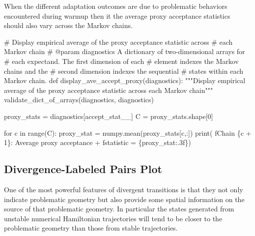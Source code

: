 \documentclass[
  letterpaper,
  DIV=11,
  numbers=noendperiod]{scrartcl}
\newenvironment{Shaded}{\begin{snugshade}}{\end{snugshade}}
\newcommand{\BuiltInTok}[1]{\textcolor[rgb]{0.00,0.23,0.31}{#1}}
\newcommand{\CommentTok}[1]{\textcolor[rgb]{0.37,0.37,0.37}{#1}}
\newcommand{\ControlFlowTok}[1]{\textcolor[rgb]{0.00,0.23,0.31}{#1}}
\newcommand{\DecValTok}[1]{\textcolor[rgb]{0.68,0.00,0.00}{#1}}
\newcommand{\KeywordTok}[1]{\textcolor[rgb]{0.00,0.23,0.31}{#1}}
\newcommand{\NormalTok}[1]{\textcolor[rgb]{0.00,0.23,0.31}{#1}}
\newcommand{\OperatorTok}[1]{\textcolor[rgb]{0.37,0.37,0.37}{#1}}
\newcommand{\SpecialCharTok}[1]{\textcolor[rgb]{0.37,0.37,0.37}{#1}}
\newcommand{\SpecialStringTok}[1]{\textcolor[rgb]{0.13,0.47,0.30}{#1}}
\newcommand{\StringTok}[1]{\textcolor[rgb]{0.13,0.47,0.30}{#1}}
\begin{document}
When the different adaptation outcomes are due to problematic behaviors
encountered during warmup then it the average proxy acceptance
statistics should also vary across the Markov chains.

\begin{Shaded}
\begin{Highlighting}[]
\CommentTok{\# Display empirical average of the proxy acceptance statistic across}
\CommentTok{\# each Markov chain}
\CommentTok{\# @param diagnostics A dictionary of two{-}dimensional arrays for}
\CommentTok{\#                    each expectand.  The first dimension of each}
\CommentTok{\#                    element indexes the Markov chains and the}
\CommentTok{\#                    second dimension indexes the sequential}
\CommentTok{\#                    states within each Markov chain.}
\KeywordTok{def}\NormalTok{ display\_ave\_accept\_proxy(diagnostics):}
  \CommentTok{"""Display empirical average of the proxy acceptance statistic}
\CommentTok{     across each Markov chain"""}
\NormalTok{  validate\_dict\_of\_arrays(diagnostics, }\StringTok{\textquotesingle{}diagnostics\textquotesingle{}}\NormalTok{)}

\NormalTok{  proxy\_stats }\OperatorTok{=}\NormalTok{ diagnostics[}\StringTok{\textquotesingle{}accept\_stat\_\_\textquotesingle{}}\NormalTok{]}
\NormalTok{  C }\OperatorTok{=}\NormalTok{ proxy\_stats.shape[}\DecValTok{0}\NormalTok{]}

  \ControlFlowTok{for}\NormalTok{ c }\KeywordTok{in} \BuiltInTok{range}\NormalTok{(C):}
\NormalTok{    proxy\_stat }\OperatorTok{=}\NormalTok{ numpy.mean(proxy\_stats[c,:])}
    \BuiltInTok{print}\NormalTok{(  }\SpecialStringTok{f\textquotesingle{}Chain }\SpecialCharTok{\{}\NormalTok{c }\OperatorTok{+} \DecValTok{1}\SpecialCharTok{\}}\SpecialStringTok{: Average proxy acceptance \textquotesingle{}}
          \OperatorTok{+} \SpecialStringTok{f\textquotesingle{}statistic = }\SpecialCharTok{\{}\NormalTok{proxy\_stat}\SpecialCharTok{:.3f\}}\SpecialStringTok{\textquotesingle{}}\NormalTok{)}
\end{Highlighting}
\end{Shaded}

\subsection{Divergence-Labeled Pairs
Plot}\label{divergence-labeled-pairs-plot}

One of the most powerful features of divergent transitions is that they
not only indicate problematic geometry but also provide some spatial
information on the source of that problematic geometry. In particular
the states generated from unstable numerical Hamiltonian trajectories
will tend to be closer to the problematic geometry than those from
stable trajectories.
\end{document}
